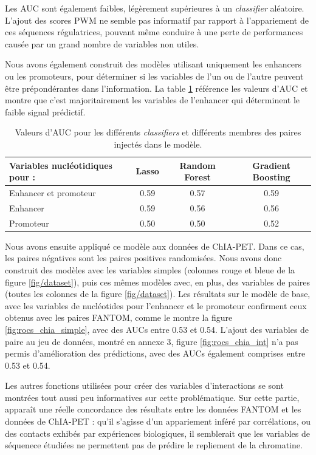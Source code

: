 \documentclass[french]{llncs}
\begin{document}
Les AUC sont également faibles, légèrement supérieures à un \textit{classifier} aléatoire.
L'ajout des scores PWM ne semble pas informatif par rapport à l'appariement de ces séquences régulatrices, pouvant même conduire à une perte de performances causée par un grand nombre de variables non utiles.

Nous avons également construit des modèles utilisant uniquement les enhancers ou les promoteurs, pour déterminer si les variables de l'un ou de l'autre peuvent être prépondérantes dans l'information. La table \ref{tab_aucs_fantom_ep} référence les valeurs d'AUC et montre que c'est majoritairement les variables de l'enhancer qui déterminent le faible signal prédictif.

\begin{table}[ht]
 \begin{center}
   \begin{tabular}{l | c c c}
   \hline
           Variables nucléotidiques pour :     & Lasso & Random Forest & Gradient Boosting  \\
   \hline
    Enhancer et promoteur & 0.59        & 0.57   &    0.59\\
    Enhancer        & 0.59   &    0.56  & 0.56\\
    Promoteur        & 0.50   &    0.50 & 0.52\\
   \hline
\end{tabular}
\caption{Valeurs d'AUC pour les différents \textit{classifiers} et différents membres des paires injectés dans le modèle.}
\label{tab_aucs_fantom_ep}
 \end{center}
\end{table}

Nous avons ensuite appliqué ce modèle aux données de ChIA-PET. Dans ce cas, les paires négatives sont les paires positives randomisées. Nous avons donc construit des modèles avec les variables simples (colonnes rouge  et bleue de la figure \ref{fig/dataset}), puis ces mêmes modèles avec, en plus, des variables de paires (toutes les colonnes de la figure \ref{fig/dataset}). Les résultats sur le modèle de base, avec les variables de nucléotides pour l'enhancer et le promoteur confirment ceux obtenus avec les paires FANTOM, comme le montre la figure \ref{fig:rocs_chia_simple}, avec des AUCs entre 0.53 et 0.54. L'ajout des variables de paire au jeu de données, montré en annexe 3, figure \ref{fig:rocs_chia_int} n'a pas permis d'amélioration des prédictions, avec des AUCs également comprises entre 0.53 et 0.54. 

Les autres fonctions utilisées pour créer des variables d'interactions se sont montrées tout aussi peu informatives sur cette problématique. Sur cette partie, apparaît une réelle concordance des résultats entre les données FANTOM et les données de ChIA-PET : qu'il s'agisse d'un appariement inféré par corrélations, ou des contacts exhibés par expériences biologiques, il semblerait que les variables de séquenece étudiées ne permettent pas de prédire le repliement de la chromatine.
\end{document}
